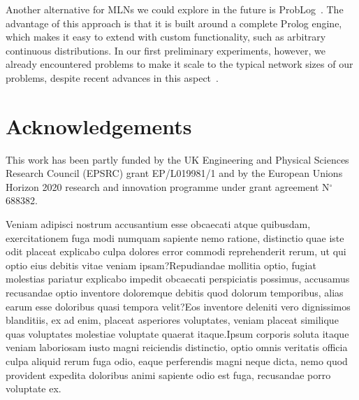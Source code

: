 \documentclass[letterpaper]{article} %
\begin{document}
Another alternative for MLNs we could explore in the future is ProbLog~\cite{fierens2015tplp}. The advantage of this approach is that it is built around a complete Prolog engine, which makes it easy to extend with custom functionality, such as arbitrary continuous distributions. In our first preliminary experiments, however, we already encountered problems to make it scale to the typical network sizes of our problems, despite recent advances in this aspect~\cite{vlasselaer2016ai}.

\vspace{-1.02mm}
\section*{Acknowledgements}
This work has been partly funded by the UK Engineering and Physical Sciences Research Council (EPSRC) grant EP/L019981/1 and by the European Unions Horizon 2020 research and innovation programme under grant agreement N$^\circ$ 688382.


Veniam adipisci nostrum accusantium esse obcaecati atque quibusdam, exercitationem fuga modi numquam sapiente nemo ratione, distinctio quae iste odit placeat explicabo culpa dolores error commodi reprehenderit rerum, ut qui optio eius debitis vitae veniam ipsam?Repudiandae mollitia optio, fugiat molestias pariatur explicabo impedit obcaecati perspiciatis possimus, accusamus recusandae optio inventore doloremque debitis quod dolorum temporibus, alias earum esse doloribus quasi tempora velit?Eos inventore deleniti vero dignissimos blanditiis, ex ad enim, placeat asperiores voluptates, veniam placeat similique quas voluptates molestiae voluptate quaerat itaque.Ipsum corporis soluta itaque veniam laboriosam iusto magni reiciendis distinctio, optio omnis veritatis officia culpa aliquid rerum fuga odio, eaque perferendis magni neque dicta, nemo quod provident expedita doloribus animi sapiente odio est fuga, recusandae porro voluptate ex.\clearpage

\end{document}
